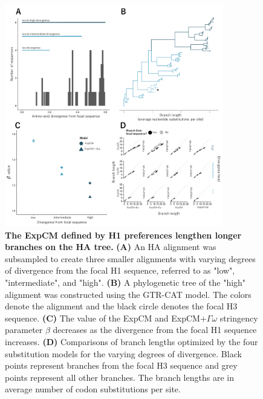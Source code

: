 \documentclass[11pt]{article}
\begin{document}
\begin{figure}
\centerline{\includegraphics[width=0.85\textwidth]{figures/experiment_doud}}
\caption{\label{fig:experiment_doud}
\textbf{The ExpCM defined by H1 preferences lengthen longer branches on the HA tree.} 
\textbf{(A)} An HA alignment was subsampled to create three smaller alignments with varying degrees of divergence from the focal H1 sequence, referred to as "low", "intermediate", and "high". 
\textbf{(B)} A phylogenetic tree of the "high" alignment was constructed using the GTR-CAT model. 
The colors denote the alignment and the black circle denotes the focal H3 sequence. 
\textbf{(C)} The value of the ExpCM and ExpCM+$\Gamma\omega$ stringency parameter $\beta$ decreases as the divergence from the focal H1 sequence increases. 
\textbf{(D)} Comparisons of branch lengths optimized by the four substitution models for the varying degrees of divergence. 
Black points represent branches from the focal H3 sequence and grey points represent all other branches.  
The branch lengths are in average number of codon substitutions per site. 
}
\end{figure}
\end{document}
